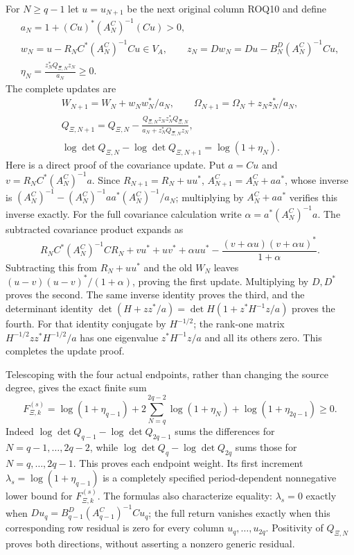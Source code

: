 \documentclass[11pt,a4paper]{article}
\begin{document}
For $N\ge q-1$ let $u=u_{N+1}$ be the next original column ROQ10 and
define
\[
 \begin{gathered}
 a_N=1+(Cu)^*(A_N^C)^{-1}(Cu)>0,\\
 w_N=u-R_NC^*(A_N^C)^{-1}Cu\in V_A,\qquad
 z_N=Dw_N=Du-B_N^D(A_N^C)^{-1}Cu,\\
 \eta_N=\frac{z_N^*Q_{\Xi,N}z_N}{a_N}\ge0.
 \end{gathered}\tag{ROQ17}
\]
The complete updates are
\[
 \begin{gathered}
 W_{N+1}=W_N+w_Nw_N^*/a_N,\qquad
 \Omega_{N+1}=\Omega_N+z_Nz_N^*/a_N,\\
 Q_{\Xi,N+1}=Q_{\Xi,N}
       -\frac{Q_{\Xi,N}z_Nz_N^*Q_{\Xi,N}}
                         {a_N+z_N^*Q_{\Xi,N}z_N},\\
 \log\det Q_{\Xi,N}-\log\det Q_{\Xi,N+1}=\log(1+\eta_N).
 \end{gathered}\tag{ROQ18}
\]
Here is a direct proof of the covariance update. Put $a=Cu$ and
$v=R_NC^*(A_N^C)^{-1}a$. Since $R_{N+1}=R_N+uu^*$,
$A_{N+1}^C=A_N^C+aa^*$, whose inverse is
$ (A_N^C)^{-1}-(A_N^C)^{-1}aa^*(A_N^C)^{-1}/a_N$;
multiplying by $A_N^C+aa^*$ verifies this inverse exactly.
For the full covariance calculation write
$\alpha=a^*(A_N^C)^{-1}a$.
The subtracted covariance product expands as
\[
 R_NC^*(A_N^C)^{-1}CR_N
       +vu^*+uv^*+\alpha uu^*
       -\frac{(v+\alpha u)(v+\alpha u)^*}{1+\alpha}.
\]
Subtracting this from $R_N+uu^*$ and the old $W_N$ leaves
$(u-v)(u-v)^*/(1+\alpha)$, proving the first update.
Multiplying by $D,D^*$ proves the second. The same inverse identity
proves the third, and the determinant identity
$\det(H+zz^*/a)=\det H(1+z^*H^{-1}z/a)$ proves the fourth.
For that identity conjugate by $H^{-1/2}$; the rank-one matrix
$H^{-1/2}zz^*H^{-1/2}/a$ has one eigenvalue $z^*H^{-1}z/a$
and all its others zero. This completes the update proof.

Telescoping with the four actual endpoints, rather than changing the
source degree, gives the exact finite sum
\[
 F_{\Xi,k}^{(s)}=\log(1+\eta_{q-1})
       +2\sum_{N=q}^{2q-2}\log(1+\eta_N)
       +\log(1+\eta_{2q-1})\ge0.
 \tag{ROQ19}
\]
Indeed $\log\det Q_{q-1}-\log\det Q_{2q-1}$ sums the differences
for $N=q-1,\ldots,2q-2$, while
$\log\det Q_q-\log\det Q_{2q}$ sums those for $N=q,\ldots,2q-1$.
This proves each endpoint weight. Its first increment
$\lambda_s=\log(1+\eta_{q-1})$ is a completely specified
period-dependent nonnegative lower bound for $F_{\Xi,k}^{(s)}$.
The formulas also characterize equality: $\lambda_s=0$ exactly when
$Du_q=B_{q-1}^D(A_{q-1}^C)^{-1}Cu_q$; the full return vanishes
exactly when this corresponding row residual is zero for every
column $u_q,\ldots,u_{2q}$. Positivity of $Q_{\Xi,N}$ proves both
directions, without asserting a nonzero generic residual.
\end{document}
